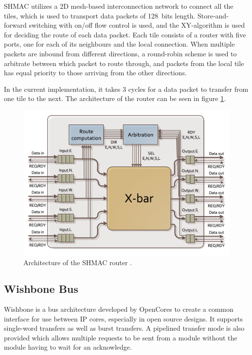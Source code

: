 SHMAC utilizes a 2D mesh-based interconnection network to connect all the tiles, which is used to transport data packets of 128~bits length.
Store-and-forward switching with on/off flow control is used, and the XY-algorithm is used for deciding the route of each data packet.
Each tile consists of a router with five ports, one for each of its neighbours and the local connection.
When multiple packets are inbound from different directions, a round-robin scheme is used to arbitrate between which
packet to route through, and packets from the local tile has equal priority to those arriving from the other directions. \cite{shmac-plan}

In the current implementation, it takes 3 cycles for a data packet to transfer from one tile to the next. 
The architecture of the router can be seen in figure \ref{fig:shmac-router}.

\begin{figure}[htb]
    \centering
    \includegraphics[width=1.0\textwidth]{Figures/Heterogeneous/SHMACRouter}
    \caption{Architecture of the SHMAC router \cite{shmac-plan}.}
    \label{fig:shmac-router}
\end{figure}

\subsection{Wishbone Bus}

Wishbone is a bus architecture developed by OpenCores to create a common interface for use between IP cores, especially in
open source designs. It supports single-word transfers as well as burst transfers. A pipelined transfer mode is also provided
which allows multiple requests to be sent from a module without the module having to wait for an acknowledge.

